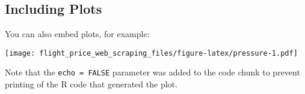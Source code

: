 \documentclass[]{article}
\begin{document}
\subsection{Including Plots}\label{including-plots}

You can also embed plots, for example:

\texttt{[image: flight\_price\_web\_scraping\_files/figure-latex/pressure-1.pdf]}

Note that the \texttt{echo\ =\ FALSE} parameter was added to the code
chunk to prevent printing of the R code that generated the plot.
\end{document}
